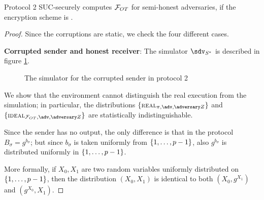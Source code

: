 \begin{proposition}
    Protocol 2 SUC-securely computes $\mathcal{F}_{OT}$ for semi-honest adversaries, if the encryption scheme is \indcpa.
\end{proposition}
\begin{proof}
    Since the corruptions are static, we check the four different cases.

    \textbf{Corrupted sender and honest receiver}: The simulator $\sdv_{S^\ast}$ is described in figure \ref{sim_dummy2_sender}.

    \begin{figure}
        \begin{center}
        \end{center}
        \caption{The simulator for the corrupted sender in protocol 2}
        \label{sim_dummy2_sender}
    \end{figure}

    We show that the environment cannot distinguish the real execution from the simulation; in particular, the distributions $\{ \textsc{\scriptsize REAL}_{\pi,\adv,\zdv} \}$ and $\{ \textsc{\scriptsize IDEAL}_{\Fun_{OT},\adv,\zdv} \}$ are statistically indistinguishable.
    
    Since the sender has no output, the only difference is that in the protocol $B_\sigma = g^{b_\sigma}$; but since $b_\sigma$ is taken uniformly from $\set{1,\dots,p-1}$, also $g^{b_\sigma}$ is distributed uniformly in $\set{1,\dots,p-1}$.

    More formally, if $X_0,X_1$ are two random variables uniformly distributed on $\set{1,\dots,p-1}$, then the distribution $(X_0,X_1)$ is identical to both $(X_0, g^{X_1})$ and $(g^{X_0}, X_1)$.


\end{proof}
